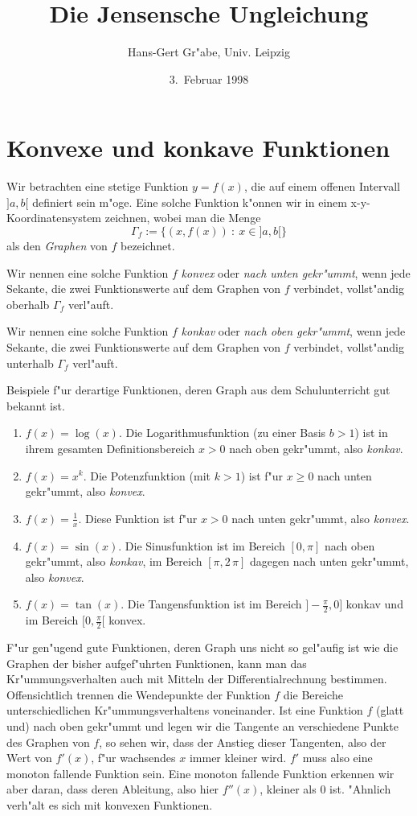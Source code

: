 \documentclass[11pt]{article}
\title{Die Jensensche Ungleichung\kosemnetlicensemark}
\author{Hans-Gert Gr"abe, Univ. Leipzig}
\date{3.~Februar 1998}
\begin{document}
\maketitle

\section{Konvexe und konkave Funktionen}

Wir betrachten eine stetige Funktion $y=f(x)$, die auf einem offenen
Intervall $]a,b[$ definiert sein m"oge. Eine solche Funktion k"onnen
wir in einem x-y-Koordinatensystem zeichnen, wobei man die Menge
\[\Gamma_f:=\{(x,f(x))\ :\ x\in ]a,b[\}\]
als den {\em Graphen} von $f$ bezeichnet. 
\medskip

\begin{definition}
Wir nennen eine solche Funktion $f$ {\em konvex} oder {\em nach unten
gekr"ummt}, wenn jede Sekante, die zwei Funktionswerte auf dem Graphen
von $f$ verbindet, vollst"andig oberhalb $\Gamma_f$ verl"auft.
\medskip

Wir nennen eine solche Funktion $f$ {\em konkav} oder {\em nach oben
gekr"ummt}, wenn jede Sekante, die zwei Funktionswerte auf dem Graphen
von $f$ verbindet, vollst"andig unterhalb $\Gamma_f$ verl"auft.
\end{definition}

Beispiele f"ur derartige Funktionen, deren Graph aus dem
Schulunterricht gut bekannt ist.
\begin{enumerate}
\item $f(x)=\log(x)$. Die Logarithmusfunktion (zu einer Basis $b>1$)
ist in ihrem gesamten Definitionsbereich $x>0$ nach oben gekr"ummt,
also {\em konkav}.
\item $f(x)=x^k$. Die Potenzfunktion (mit $k>1$) ist f"ur $x\geq 0$
nach unten gekr"ummt, also {\em konvex}.
\item $f(x)=\frac{1}{x}$. Diese Funktion ist f"ur $x> 0$ nach unten
gekr"ummt, also {\em konvex}.
\item $f(x)=\sin(x)$. Die Sinusfunktion ist im Bereich $[0,\pi]$ nach
oben gekr"ummt, also {\em konkav}, im Bereich $[\pi,2\,\pi]$ dagegen
nach unten gekr"ummt, also {\em konvex}.
\item $f(x)=\tan(x)$. Die Tangensfunktion ist im Bereich
$]-\frac{\pi}{2},0]$ konkav und im Bereich $[0,\frac{\pi}{2}[$
konvex. 
\end{enumerate}

F"ur gen"ugend gute Funktionen, deren Graph uns nicht so gel"aufig ist
wie die Graphen der bisher aufgef"uhrten Funktionen, kann man das
Kr"ummungsverhalten auch mit Mitteln der Differentialrechnung
bestimmen. Offensichtlich trennen die Wendepunkte der Funktion $f$ die
Bereiche unterschiedlichen Kr"ummungsverhaltens voneinander. Ist eine
Funktion $f$ (glatt und) nach oben gekr"ummt und legen wir die
Tangente an verschiedene Punkte des Graphen von $f$, so sehen wir,
dass der Anstieg dieser Tangenten, also der Wert von $f'(x)$, f"ur
wachsendes $x$ immer kleiner wird. $f'$ muss also eine monoton
fallende Funktion sein. Eine monoton fallende Funktion erkennen wir
aber daran, dass deren Ableitung, also hier $f''(x)$, kleiner als 0
ist. "Ahnlich verh"alt es sich mit konvexen Funktionen.
\end{document}
